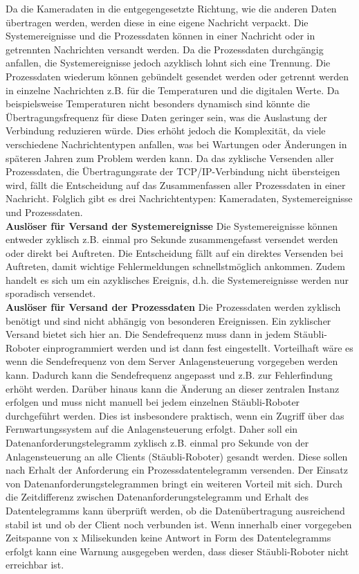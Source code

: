 \documentclass[ a4paper,
                oneside,
                toc=bibliography,
                toc=listof
                ]{scrbook}
\begin{document}
	Da die Kameradaten in die entgegengesetzte Richtung, wie die anderen Daten übertragen werden, werden diese in eine eigene Nachricht verpackt. Die Systemereignisse und die Prozessdaten können in einer Nachricht oder in getrennten Nachrichten versandt werden. Da die Prozessdaten durchgängig anfallen, die Systemereignisse jedoch azyklisch lohnt sich eine Trennung. Die Prozessdaten wiederum können gebündelt gesendet werden oder getrennt werden in einzelne Nachrichten z.B. für die Temperaturen und die digitalen Werte. Da beispielsweise Temperaturen nicht besonders dynamisch sind könnte die Übertragungsfrequenz für diese Daten geringer sein, was die Auslastung der Verbindung reduzieren würde. Dies erhöht jedoch die Komplexität, da viele verschiedene Nachrichtentypen anfallen, was bei Wartungen oder Änderungen in späteren Jahren zum Problem werden kann. Da das zyklische Versenden aller Prozessdaten, die Übertragungsrate der TCP/IP-Verbindung nicht übersteigen wird, fällt die Entscheidung auf das Zusammenfassen aller Prozessdaten in einer Nachricht. Folglich gibt es drei Nachrichtentypen: Kameradaten, Systemereignisse und Prozessdaten.\\
	\textbf{Auslöser für Versand der Systemereignisse}
	Die Systemereignisse können entweder zyklisch z.B. einmal pro Sekunde zusammengefasst versendet werden oder direkt bei Auftreten. Die Entscheidung fällt auf ein direktes Versenden bei Auftreten, damit wichtige Fehlermeldungen schnellstmöglich ankommen. Zudem handelt es sich um ein azyklisches Ereignis, d.h. die Systemereignisse werden nur sporadisch versendet.\\
	\textbf{Auslöser für Versand der Prozessdaten}
	Die Prozessdaten werden zyklisch benötigt und sind nicht abhängig von besonderen Ereignissen. Ein zyklischer Versand bietet sich hier an. Die Sendefrequenz muss dann in jedem Stäubli-Roboter einprogrammiert werden und ist dann fest eingestellt. Vorteilhaft wäre es wenn die Sendefrequenz von dem Server Anlagensteuerung vorgegeben werden kann. Dadurch kann die Sendefrequenz angepasst und z.B. zur Fehlerfindung erhöht werden. Darüber hinaus kann die Änderung an dieser zentralen Instanz erfolgen und muss nicht manuell bei jedem einzelnen Stäubli-Roboter durchgeführt werden. Dies ist insbesondere praktisch, wenn ein Zugriff über das Fernwartungssystem auf die Anlagensteuerung erfolgt. Daher soll ein Datenanforderungstelegramm zyklisch z.B. einmal pro Sekunde von der Anlagensteuerung an alle Clients (Stäubli-Roboter) gesandt werden. Diese sollen nach Erhalt der Anforderung ein Prozessdatentelegramm versenden. Der Einsatz von Datenanforderungstelegrammen bringt ein weiteren Vorteil mit sich. Durch die Zeitdifferenz zwischen Datenanforderungstelegramm und Erhalt des Datentelegramms kann überprüft werden, ob die Datenübertragung ausreichend stabil ist und ob der Client noch verbunden ist. Wenn innerhalb einer vorgegeben Zeitspanne von x Milisekunden keine Antwort in Form des Datentelegramms erfolgt kann eine Warnung ausgegeben werden, dass dieser Stäubli-Roboter nicht erreichbar ist.\\
\end{document}
